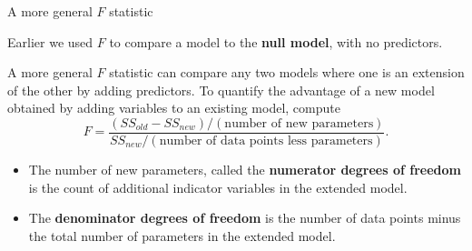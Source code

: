 \documentclass[
  ignorenonframetext,
]{beamer}
\providecommand{\tightlist}{%
  \setlength{\itemsep}{0pt}\setlength{\parskip}{0pt}}
\begin{document}
\begin{frame}{A more general \(F\) statistic}
\protect\hypertarget{a-more-general-f-statistic}{}

Earlier we used \(F\) to compare a model to the \textbf{null model},
with no predictors.

A more general \(F\) statistic can compare any two models where one is
an extension of the other by adding predictors. To quantify the
advantage of a new model obtained by adding variables to an existing
model, compute \[
F = \frac{(SS_{old}-SS_{new})/(\text{number of new parameters} )}{SS_{new}/(\text{number of data points less parameters})}.
\]

\begin{itemize}
\tightlist
\item
  The number of new parameters, called the \textbf{numerator degrees of
  freedom} is the count of additional indicator variables in the
  extended model.
\item
  The \textbf{denominator degrees of freedom} is the number of data
  points minus the total number of parameters in the extended model.
\end{itemize}

\end{frame}
\end{document}
